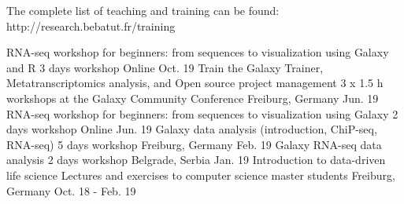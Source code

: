 
\begin{small}
The complete list of teaching and training can be found: http://research.bebatut.fr/training
\end{small}

\begin{cvhonors}
  \cvhonor
    {RNA-seq workshop for beginners: from sequences to visualization using Galaxy and R} %
    {3 days workshop} %
    {Online} %
    {Oct. 19} %
  \cvhonor
    {Train the Galaxy Trainer, Metatranscriptomics analysis, and Open source project management} %
    {3 x 1.5 h workshops at the Galaxy Community Conference} %
    {Freiburg, Germany} %
    {Jun. 19} %
  \cvhonor
    {RNA-seq workshop for beginners: from sequences to visualization using Galaxy} %
    {2 days workshop} %
    {Online} %
    {Jun. 19} %
  \cvhonor
    {Galaxy data analysis (introduction, ChiP-seq, RNA-seq)} %
    {5 days workshop} %
    {Freiburg, Germany} %
    {Feb. 19} %
  \cvhonor
    {Galaxy RNA-seq data analysis} %
    {2 days workshop} %
    {Belgrade, Serbia} %
    {Jan. 19} %
  \cvhonor
    {Introduction to data-driven life science} %
    {Lectures and exercises to computer science master students} %
    {Freiburg, Germany} %
    {Oct. 18 - Feb. 19} %
\end{cvhonors}

